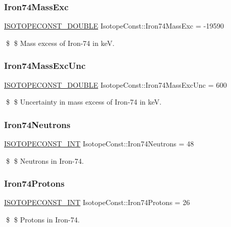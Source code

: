 \subsubsection{\texorpdfstring{Iron74\+Mass\+Exc}{Iron74MassExc}}
{\footnotesize\ttfamily \mbox{\hyperlink{group___isotope_const-_macros_ga8f45a7272ce02c0b4c65c44636ed719a}{I\+S\+O\+T\+O\+P\+E\+C\+O\+N\+S\+T\+\_\+\+D\+O\+U\+B\+LE}} Isotope\+Const\+::\+Iron74\+Mass\+Exc = -\/19590}

\$ \$ Mass excess of Iron-\/74 in keV. \mbox{\label{group___isotope_const-_iron-_fe74_ga5ad69bfeec4ca13d465410d45fc4e83d}} 
\subsubsection{\texorpdfstring{Iron74\+Mass\+Exc\+Unc}{Iron74MassExcUnc}}
{\footnotesize\ttfamily \mbox{\hyperlink{group___isotope_const-_macros_ga8f45a7272ce02c0b4c65c44636ed719a}{I\+S\+O\+T\+O\+P\+E\+C\+O\+N\+S\+T\+\_\+\+D\+O\+U\+B\+LE}} Isotope\+Const\+::\+Iron74\+Mass\+Exc\+Unc = 600}

\$ \$ Uncertainty in mass excess of Iron-\/74 in keV. \mbox{\label{group___isotope_const-_iron-_fe74_ga4c130fe27e4cb57262f945733cf5b0cd}} 
\subsubsection{\texorpdfstring{Iron74\+Neutrons}{Iron74Neutrons}}
{\footnotesize\ttfamily \mbox{\hyperlink{group___isotope_const-_macros_ga5f18360b3e99483a35c32d789e62621c}{I\+S\+O\+T\+O\+P\+E\+C\+O\+N\+S\+T\+\_\+\+I\+NT}} Isotope\+Const\+::\+Iron74\+Neutrons = 48}

\$ \$ Neutrons in Iron-\/74. \mbox{\label{group___isotope_const-_iron-_fe74_gaccbb762acacd5a67dee638558673bd16}} 
\subsubsection{\texorpdfstring{Iron74\+Protons}{Iron74Protons}}
{\footnotesize\ttfamily \mbox{\hyperlink{group___isotope_const-_macros_ga5f18360b3e99483a35c32d789e62621c}{I\+S\+O\+T\+O\+P\+E\+C\+O\+N\+S\+T\+\_\+\+I\+NT}} Isotope\+Const\+::\+Iron74\+Protons = 26}

\$ \$ Protons in Iron-\/74. 